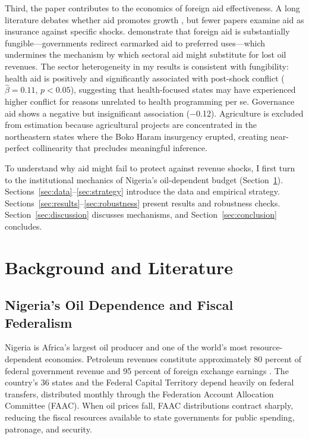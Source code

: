 \documentclass[12pt]{article}
\begin{document}
Third, the paper contributes to the economics of foreign aid effectiveness. A long literature debates whether aid promotes growth \citep{collier2004aid, alesina2000foreign, roodman2015refinement}, but fewer papers examine aid as insurance against specific shocks. \citet{feyzioglu1998fungibility} demonstrate that foreign aid is substantially fungible---governments redirect earmarked aid to preferred uses---which undermines the mechanism by which sectoral aid might substitute for lost oil revenues. The sector heterogeneity in my results is consistent with fungibility: health aid is positively and significantly associated with post-shock conflict ($\hat{\beta} = 0.11$, $p < 0.05$), suggesting that health-focused states may have experienced higher conflict for reasons unrelated to health programming per se. Governance aid shows a negative but insignificant association ($-$0.12). Agriculture is excluded from estimation because agricultural projects are concentrated in the northeastern states where the Boko Haram insurgency erupted, creating near-perfect collinearity that precludes meaningful inference.

To understand why aid might fail to protect against revenue shocks, I first turn to the institutional mechanics of Nigeria's oil-dependent budget (Section~\ref{sec:background}). Sections~\ref{sec:data}--\ref{sec:strategy} introduce the data and empirical strategy. Sections~\ref{sec:results}--\ref{sec:robustness} present results and robustness checks. Section~\ref{sec:discussion} discusses mechanisms, and Section~\ref{sec:conclusion} concludes.


\section{Background and Literature}
\label{sec:background}

\subsection{Nigeria's Oil Dependence and Fiscal Federalism}

Nigeria is Africa's largest oil producer and one of the world's most resource-dependent economies. Petroleum revenues constitute approximately 80 percent of federal government revenue and 95 percent of foreign exchange earnings \citep{salaimartin2013addressing}. The country's 36 states and the Federal Capital Territory depend heavily on federal transfers, distributed monthly through the Federation Account Allocation Committee (FAAC). When oil prices fall, FAAC distributions contract sharply, reducing the fiscal resources available to state governments for public spending, patronage, and security.
\end{document}
